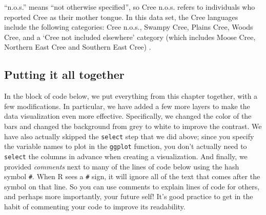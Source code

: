 \documentclass[
  12pt,
]{krantz}
\renewenvironment{quote}{\begin{VF}}{\end{VF}}
\begin{document}
\begin{quote}
``n.o.s.'' means ``not otherwise specified'', so Cree n.o.s. refers to
individuals who reported Cree as their mother tongue. In this data set, the
Cree languages include the following categories: Cree n.o.s., Swampy Cree,
Plains Cree, Woods Cree, and a `Cree not included elsewhere' category (which
includes Moose Cree, Northern East Cree and Southern East Cree)
\citep{language2018}.
\end{quote}

\hypertarget{putting-it-all-together}{%
\subsection{Putting it all together}\label{putting-it-all-together}}

In the block of code below, we put everything from this chapter together, with a few
modifications. In particular, we have
added a few more layers to make the data visualization even more effective.
Specifically, we changed the color of the bars and changed the background from
grey to white to improve the contrast. We have also actually skipped the
\texttt{select} step that we did above; since you specify the variable names to plot
in the \texttt{ggplot} function, you don't actually need to \texttt{select} the columns in advance
when creating a visualization. And finally, we provided \emph{comments} next to
many of the lines of code below using the
hash symbol \texttt{\#}. When R sees a \texttt{\#} sign,   it
will ignore all of the text that
comes after the symbol on that line. So you can use comments to explain lines
of code for others, and perhaps more importantly, your future self!
It's good practice to get in the habit of
commenting your code to improve its readability.
\end{document}

